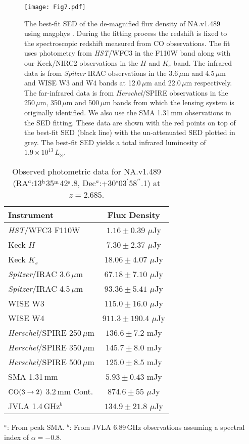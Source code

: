 \documentclass[iop,apj,useAMS,usenatbib]{emulateapj-rtx4}
\begin{document}
\begin{figure}[t]
\centering
\leavevmode
\texttt{[image: Fig7.pdf]}
\caption{The best-fit SED of the de-magnified flux density of NA.v1.489 using
  {\sc magphys} \citep{Cunha2008}. During the fitting process the redshift is fixed to
the spectroscopic redshift measured from CO observations. The fit uses
photometry from {\it HST}/WFC3 in the F110W band
  along with our Keck/NIRC2 observations in the $H$ and $K_s$ band. The
  infrared data is from {\it Spitzer} IRAC observations in the 3.6\,$\mu$m
  and 4.5\,$\mu$m and WISE W3 and W4 bands at 12.0\,$\mu$m and
  22.0\,$\mu$m respectively. The far-infrared data is from {\it Herschel}/SPIRE observations in
the 250\,$\mu$m, 350\,$\mu$m and 500\,$\mu$m bands from which the lensing system is
originally identified. We also use the SMA 1.31\,mm observations in
the SED fitting. These data
are shown with the red points on top of the best-fit SED (black line)
with the un-attenuated SED plotted in grey. The best-fit SED yields a
total infrared luminosity of $1.9\times10^{13}\,{L_{\odot}}$.}
\label{fig:Fig7}
\end{figure}

\begin{table}
\begin{center}
\caption{Observed photometric data for NA.v1.489 (RA$^a$:13$^{\rm
  h}$35$^{\rm m}$42$^{\rm s}$.8,
Dec$^a$:+30$^{\circ}$03$^{\prime}$58$^{\prime\prime}$.1) at $z=2.685$.}
\begin{tabular}{lc}
\hline
\hline
Instrument & Flux Density \\ 
\hline
{\it HST}/WFC3 F110W & $1.16\pm0.39$ $\mu$Jy \\
Keck $H$ & $7.30\pm2.37$ $\mu$Jy \\ 
Keck $K_s$ & $18.06\pm4.07$ $\mu$Jy \\
{\it Spitzer}/IRAC 3.6\,$\mu$m & $67.18\pm7.10$ $\mu$Jy \\
{\it Spitzer}/IRAC 4.5\,$\mu$m & $93.36\pm5.41$ $\mu$Jy \\ 
WISE W3 & $115.0\pm16.0$ $\mu$Jy \\
WISE W4 & $911.3\pm190.4$ $\mu$Jy \\
{\it Herschel}/SPIRE 250\,$\mu$m & $136.6\pm7.2$ mJy \\
{\it Herschel}/SPIRE 350\,$\mu$m & $145.7\pm8.0$ mJy \\
{\it Herschel}/SPIRE 500\,$\mu$m & $125.0\pm8.5$ mJy \\
SMA 1.31\,mm & $5.93\pm0.43$ mJy \\
${\rm CO(3\rightarrow2)}$ 3.2\,mm Cont. & $874.6\pm55$ $\mu$Jy \\
JVLA 1.4\,GHz$^b$ & $134.9\pm21.8$ $\mu$Jy \\
\hline
\end{tabular}
\end{center}
\footnotesize
$^a$: From peak SMA. $^b$: From JVLA 6.89\,GHz observations assuming a
spectral index of $\alpha=-0.8$.
\end{table}
\end{document}
